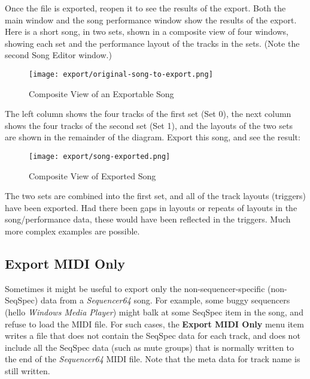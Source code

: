    Once the file is exported, reopen it to see the results of the export.
   Both the main window and the song performance window show the results of the
   export.
   Here is a short song, in two sets, shown in a composite view of
   four windows,
   showing each set and the performance layout of the tracks in the sets.
   (Note the second Song Editor window.)

\begin{figure}[H]
   \centering 
   \texttt{[image: export/original-song-to-export.png]}
   \caption{Composite View of an Exportable Song}
   \label{fig:seq64_original_song_to_export}
\end{figure}

   The left column shows the four tracks of the first set (Set 0), the next
   column shows the four tracks of the second set (Set 1), and the
   layouts of the two sets are shown in the remainder of the diagram.
   Export this song, and see the result:

\begin{figure}[H]
   \centering 
   \texttt{[image: export/song-exported.png]}
   \caption{Composite View of Exported Song}
   \label{fig:seq64_song_exported}
\end{figure}

   The two sets are combined into the first set,
   and all of the track layouts (triggers) have been exported.
   Had there been gaps in layouts or repeats of layouts in the song/performance
   data, these would have been reflected in the triggers.
   Much more complex examples are possible.

\subsection{Export MIDI Only}
\label{subsec:seq64_midi_export_file_export_midi_only}

   Sometimes it might be useful to export only the non-sequencer-specific
   (non-SeqSpec) data from a \textsl{Sequencer64} song.
   For example, some buggy sequencers
   (hello \textsl{Windows Media Player})
   might balk at some SeqSpec item in the song, and refuse to load the MIDI
   file.
   For such cases,
   the \textbf{Export MIDI Only} menu item writes a file that does not contain
   the SeqSpec data for each track, and does not include all the SeqSpec data
   (such as mute groups) that is normally written to the end of the
   \textsl{Sequencer64} MIDI file.
   Note that the meta data for track name is still written.

